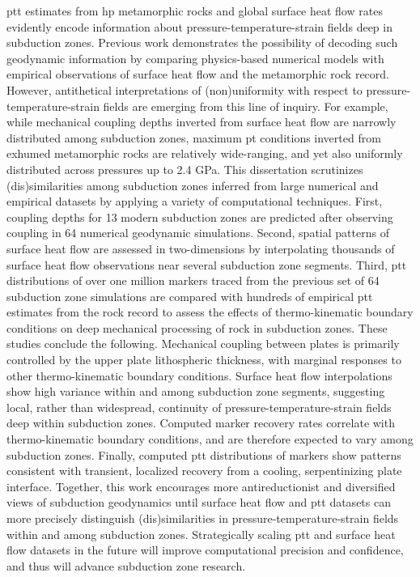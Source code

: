 \Gls{ptt} estimates from \gls{hp} metamorphic rocks and global surface heat flow rates evidently encode information about pressure-temperature-strain fields deep in subduction zones. Previous work demonstrates the possibility of decoding such geodynamic information by comparing physics-based numerical models with empirical observations of surface heat flow and the metamorphic rock record. However, antithetical interpretations of (non)uniformity with respect to pressure-temperature-strain fields are emerging from this line of inquiry. For example, while
mechanical coupling depths inverted from surface heat flow are narrowly distributed among subduction zones, maximum \gls{pt} conditions inverted from exhumed metamorphic rocks are relatively wide-ranging, and yet also uniformly distributed across pressures up to 2.4 GPa. This dissertation scrutinizes (dis)similarities among subduction zones inferred from large numerical and empirical datasets by applying a variety of computational techniques. First, coupling depths for 13 modern subduction zones are predicted after observing coupling in 64 numerical
geodynamic simulations. Second, spatial patterns of surface heat flow are assessed in two-dimensions by interpolating thousands of surface heat flow observations near several subduction zone segments. Third, \gls{ptt} distributions of over one million markers traced from the previous set of 64 subduction zone simulations are compared with hundreds of empirical \gls{ptt} estimates from the rock record to assess the effects of thermo-kinematic boundary conditions on deep mechanical processing of rock in subduction zones. These studies conclude the following. Mechanical
coupling between plates is primarily controlled by the upper plate lithospheric thickness, with marginal responses to other thermo-kinematic boundary conditions. Surface heat flow interpolations show high variance within and among subduction zone segments, suggesting local, rather than widespread, continuity of pressure-temperature-strain fields deep within subduction zones. Computed marker recovery rates correlate with thermo-kinematic boundary conditions, and are therefore expected to vary among subduction zones. Finally, computed \gls{ptt} distributions
of markers show patterns consistent with transient, localized recovery from a cooling, serpentinizing plate interface. Together, this work encourages more antireductionist and diversified views of subduction geodynamics until surface heat flow and \gls{ptt} datasets can more precisely distinguish (dis)similarities in pressure-temperature-strain fields within and among subduction zones. Strategically scaling \gls{ptt} and surface heat flow datasets in the future will improve computational precision and confidence, and thus will advance subduction zone research.